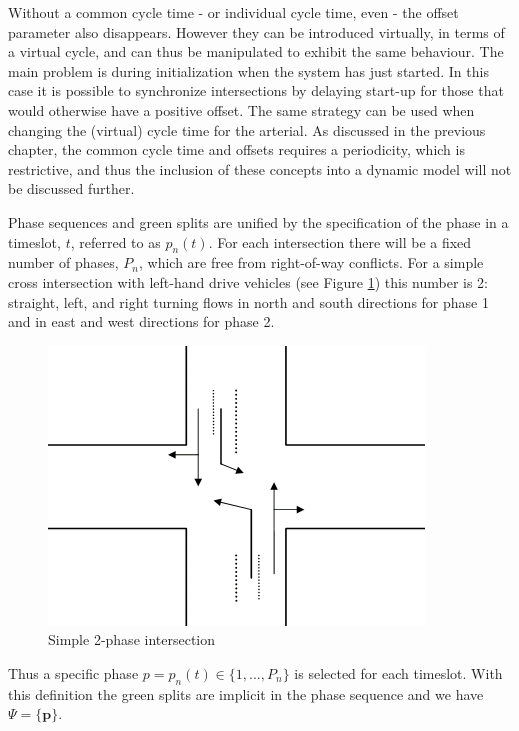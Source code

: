 Without a common cycle time - or individual cycle time, even - the
offset parameter also disappears. However they can be introduced
virtually, in terms of a virtual cycle, and can thus be manipulated to
exhibit the same behaviour.  The main problem is during initialization
when the system has just started. In this case it is possible to
synchronize intersections by delaying start-up for those that would
otherwise have a positive offset. The same strategy can be used when
changing the (virtual) cycle time for the arterial. As discussed in
the previous chapter, the common cycle time and offsets requires a
periodicity, which is restrictive, and thus the inclusion of these
concepts into a dynamic model will not be discussed further.

Phase sequences and green splits are unified by the specification of
the phase in a timeslot, $t$, referred to as $p_n(t)$. For each
intersection there will be a fixed number of phases, $P_n$, which are
free from right-of-way conflicts. For a simple cross intersection with
left-hand drive vehicles (see Figure \ref{fig:simple_intersection})
this number is 2: straight, left, and right turning flows in north and
south directions for phase 1 and in east and west directions for phase
2.

\begin{figure}[!ht]
\begin{center}
\includegraphics[scale=0.4]{simple_intersection.png} 
\end{center}
\caption{Simple 2-phase intersection}
\label{fig:simple_intersection}
\end{figure}

Thus a specific phase $p = p_n(t) \in \lbrace 1,...,P_n \rbrace$ is
selected for each timeslot. With this definition the green splits are
implicit in the phase sequence and we have $\Psi = \lbrace \textbf{p}
\rbrace $.

